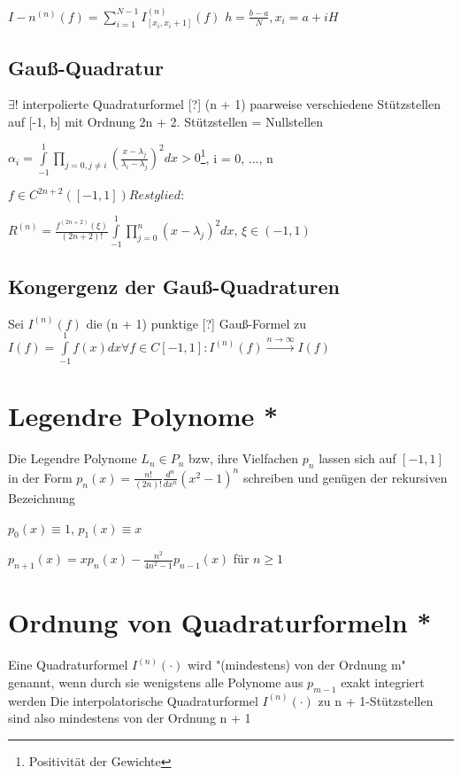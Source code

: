 \documentclass[12pt,a4paper]{article} %
\newcommand*\tab[1][1cm]{\hspace*{#1}}
\begin{document}
	$I-n^{(n)}(f) = \sum\limits_{i = 1}^{N - 1}I_{[x_i, x_i + 1]}^{(n)}(f)$ \tab $h = \frac{b - a}{N}, x_i = a + iH$
	
	\subsection{Gauß-Quadratur}
	
	$\exists!$ interpolierte Quadraturformel [?] (n + 1) paarweise verschiedene Stützstellen auf [-1, b] mit Ordnung 2n + 2. Stützstellen = Nullstellen
	
	$\alpha_i = \int\limits_{-1}^1\prod\limits_{j = 0, j \ne i}(\frac{x - \lambda_j}{\lambda_i - \lambda_j})^2 dx > 0$\footnote{Positivität der Gewichte}, \tab i = 0, ..., n
	
	$f\in C^{2n + 2}([-1, 1]) Restglied:$
	
	$R^{(n)} = \frac{f^{(2n + 2)}(\xi)}{(2n + 2)!}\int\limits_{-1}^1\prod\limits_{j = 0}^n(x - \lambda_j)^2dx$, \tab $\xi \in (-1 , 1)$
	
	\subsection{Kongergenz der Gauß-Quadraturen}
	
	Sei $I^{(n)}(f)$ die (n + 1) punktige [?] Gauß-Formel zu $I(f) = \int\limits_{-1}^1f(x)dx \forall f \in C[-1, 1]: I^{(n)}(f) \xrightarrow{n \rightarrow \infty} I(f)$
	
	\section{Legendre Polynome *}
	
	Die Legendre Polynome $L_n \in P_n$ bzw, ihre Vielfachen $p_n$ lassen sich auf $[-1, 1]$ in der Form $p_n(x) = \frac{n!}{(2n)!}\frac{d^n}{dx^n}(x^2 - 1)^n$ schreiben und genügen der rekursiven Bezeichnung
	
	$p_0(x) \equiv 1$, $p_1(x) \equiv x$
	
	$p_{n + 1}(x) = xp_n(x) - \frac{n^2}{4n^2 - 1}p_{n - 1}(x)$ für $n \ge 1$
	
	\section{Ordnung von Quadraturformeln *}
	
	Eine Quadraturformel $I^{(n)}(\cdot)$ wird "(mindestens) von der Ordnung m" genannt, wenn durch sie wenigstens alle Polynome aus $p_{m - 1}$ exakt integriert werden
	Die interpolatorische Quadraturformel $I^{(n)}(\cdot)$ zu n + 1-Stützstellen sind also mindestens von der Ordnung n + 1
	
\end{document}
